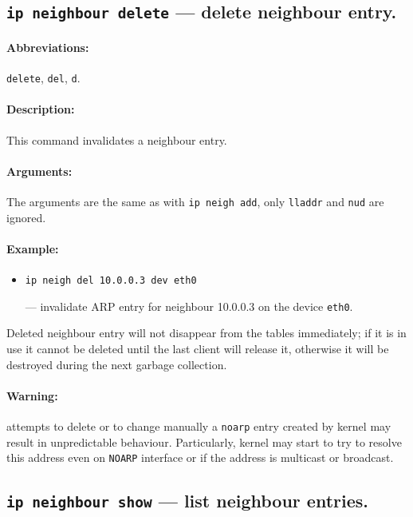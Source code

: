 \subsection{{\tt ip neighbour delete} --- delete neighbour entry.}

\paragraph{Abbreviations:} \verb|delete|, \verb|del|, \verb|d|.

\paragraph{Description:} This command invalidates a neighbour entry.

\paragraph{Arguments:} The arguments are the same as with \verb|ip neigh add|,
only \verb|lladdr| and \verb|nud| are ignored.


\paragraph{Example:}
\begin{itemize}
\item \verb|ip neigh del 10.0.0.3 dev eth0|

--- invalidate ARP entry for neighbour 10.0.0.3 on the device \verb|eth0|.

\end{itemize}

\begin{NB}
 Deleted neighbour entry will not disappear from the tables
 immediately; if it is in use it cannot be deleted until the last
 client will release it, otherwise it will be destroyed during
 the next garbage collection.
\end{NB}


\paragraph{Warning:} attempts to delete or to change manually
a \verb|noarp| entry created by kernel may result in unpredictable behaviour.
Particularly, kernel may start to try to resolve this address even
on \verb|NOARP| interface or if the address is multicast or broadcast.


\subsection{{\tt ip neighbour show} --- list neighbour entries.}

